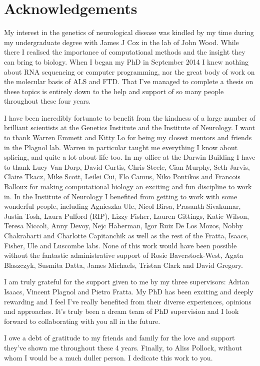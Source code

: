 \pagebreak
\clearpage

\section*{Acknowledgements}

My interest in the genetics of neurological disease was kindled by my time during my undergraduate degree with James J Cox in the lab of John Wood.
While there I realised the importance of computational methods and the insight they can bring to biology.  
When I began my PhD in September 2014 I knew nothing about RNA sequencing or computer programming, nor the great body of work on the molecular basis of ALS and FTD. 
That I've managed to complete a thesis on these topics is entirely down to the help and support of so many people throughout these four years.

I have been incredibly fortunate to benefit from the kindness of a large number of brilliant scientists at the Genetics Institute and the Institute of Neurology.
I want to thank Warren Emmett and Kitty Lo for being my closest mentors and friends in the Plagnol lab. 
Warren in particular taught me everything I know about splicing, and quite a lot about life too.
In my office at the Darwin Building I have to thank Lucy Van Dorp, David Curtis, Chris Steele, Cian Murphy, Seth Jarvis, Claire Tkacz, Mike Scott, Leilei Cui, Flo Camus, Niko Pontikos and Francois Balloux for making computational biology an exciting and fun discipline to work in.
In the Institute of Neurology I benefited from getting to work with some wonderful people, including Agnieszka Ule, Nicol Birsa, Prasanth Sivakumar, Justin Tosh, Laura Pulford (RIP), Lizzy Fisher, Lauren Gittings, Katie Wilson, Teresa Niccoli, Anny Devoy, Nejc Haberman, Igor Ruiz De Los Mozos, Nobby Chakrabarti and Charlotte Capitanchik as well as the rest of the Fratta, Isaacs, Fisher, Ule and Luscombe labs.
None of this work would have been possible without the fantastic administrative support of Rosie Baverstock-West, Agata Blaszczyk, Susmita Datta, James Michaels, Tristan Clark and David Gregory.

I am truly grateful for the support given to me by my three supervisors: Adrian Isaacs, Vincent Plagnol and Pietro Fratta. 
My PhD has been exciting and deeply rewarding and I feel I've really benefited from their diverse experiences, opinions and approaches.
It's truly been a dream team of PhD supervision and I look forward to collaborating with you all in the future.

I owe a debt of gratitude to my friends and family for the love and support they've shown me throughout these 4 years.
Finally, to Aliss Pollock, without whom I would be a much duller person. I dedicate this work to you.
